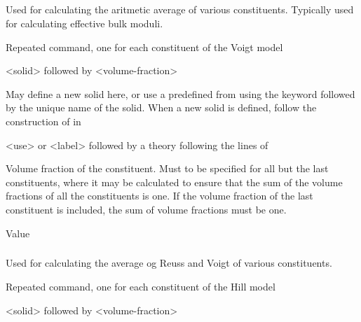 {\subparagraph{}
 \slist
   \item \Description Used for calculating the aritmetic average of various constituents. Typically used for calculating effective bulk moduli.
   \item \Argument
   \item \Default
 \elist

 \slist
   \item \Description Repeated command, one for each constituent of the Voigt model
   \item \Argument <solid> followed by <volume-fraction>
   \item \Default
 \elist

 \slist
   \item \Description May define a new solid here, or use a predefined  from  using the keyword  followed by the unique name of the solid. When a new solid is defined, follow the construction of  in 
   \item \Argument <use> or <label> followed by a theory following the lines of 
   \item \Default
 \elist

 \slist
   \item \Description Volume fraction of the constituent. Must to be specified for all but the last constituents, where it may be calculated to ensure that the sum of the volume fractions of all the constituents is one. If the volume fraction of the last constituent is included, the sum of volume fractions must be one.
   \item \Argument Value
   \item \Default
 \elist

\subparagraph{}
 \slist
   \item \Description Used for calculating the average og Reuss and Voigt of various constituents.
   \item \Argument
   \item \Default
 \elist

 \slist
   \item \Description Repeated command, one for each constituent of the Hill model
   \item \Argument <solid> followed by <volume-fraction>
   \item \Default
 \elist

}
